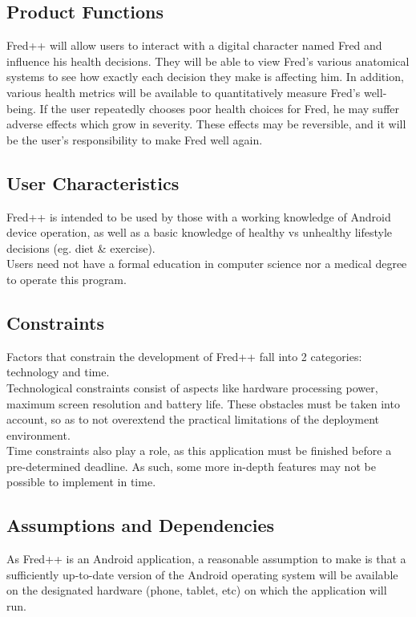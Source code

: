 \documentclass[]{article}
\begin{document}
\subsection{Product Functions}
\label{sub:product_functions}
	Fred++ will allow users to interact with a digital character named Fred and 
	influence his health decisions. They will be able to view Fred's various 
	anatomical systems to see how exactly each decision they make is 
	affecting him. In addition, various health metrics will be available to 
	quantitatively measure Fred's well-being. If the user repeatedly chooses 
	poor health choices for Fred, he may suffer adverse effects which grow in 
	severity. These effects may be reversible, and it will be the user's 
	responsibility to make Fred well again.

\subsection{User Characteristics}
\label{sub:user_characteristics}
	Fred++ is intended to be used by those with a working knowledge of Android 
	device operation, as well as a basic knowledge of healthy vs unhealthy 
	lifestyle decisions (eg. diet \& exercise).\\
	Users need not have a formal education in computer science nor a medical 
	degree to operate this program.

\subsection{Constraints}
\label{sub:constraints}
	Factors that constrain the development of Fred++ fall into 2 categories: 
	technology and time.\\
	Technological constraints consist of aspects like hardware processing 
	power, maximum screen resolution and battery life. These obstacles must be 
	taken into account, so as to not overextend the practical limitations of 
	the deployment environment.\\
	Time constraints also play a role, as this application must be finished 
	before a pre-determined deadline. As such, some more in-depth features may 
	not be possible to implement in time. 

\subsection{Assumptions and Dependencies}
\label{sub:assumptions_and_dependencies}
	As Fred++ is an Android application, a reasonable assumption to make is 
	that a sufficiently up-to-date version of the Android operating system will 
	be available on the designated hardware (phone, tablet, etc) on which the 
	application will run.
\end{document}
